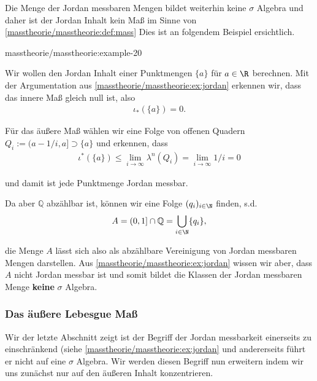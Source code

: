 \documentclass[letterpaper,10pt,english]{jupyterBook}
\begin{document}
\par
Die Menge der Jordan messbaren Mengen bildet weiterhin keine \(\sigma\) Algebra und daher ist der Jordan Inhalt kein Maß im Sinne von \cref{masstheorie/masstheorie:def:mass}  Dies ist an folgendem Beispiel ersichtlich.
\begin{example}{}{masstheorie/masstheorie:example-20}



\par
Wir wollen den Jordan Inhalt einer Punktmengen \(\{a\}\) für \(a\in\R\) berechnen. Mit der Argumentation aus \cref{masstheorie/masstheorie:ex:jordan} erkennen wir, dass das innere Maß gleich null ist, also
\begin{align*}
\iota_\ast(\{a\}) = 0.
\end{align*}
\par
Für das äußere Maß wählen wir eine Folge von offenen Quadern \(Q_i:= (a-1/i, a] \supset \{a\}\) und erkennen, dass
\begin{align*}
\iota^\ast(\{a\})\leq \lim_{i\to\infty} \lambda^n(Q_i) = \lim_{i\to\infty} 1/i = 0
\end{align*}
\par
und damit ist jede Punktmenge Jordan messbar.

\par
Da aber \(\mathbb{Q}\) abzählbar ist, können wir eine Folge \((q_i)_{i\in\N}\) finden, s.d.
\begin{align*}
A = (0,1]\cap \mathbb{Q} = \bigcup_{i\in\N} \{q_i\},
\end{align*}
\par
die Menge \(A\) lässt sich also als abzählbare Vereinigung von Jordan messbaren Mengen darstellen. Aus \cref{masstheorie/masstheorie:ex:jordan} wissen wir aber, dass \(A\) nicht Jordan messbar ist und somit bildet die Klassen der Jordan messbaren Menge \textbf{keine} \(\sigma\) Algebra.
\end{example}


\subsubsection{Das äußere Lebesgue Maß}
\label{\detokenize{masstheorie/masstheorie:das-auszere-lebesgue-masz}}
\par
Wir der letzte Abschnitt zeigt ist der Begriff der Jordan messbarkeit einerseits zu einschränkend (siehe \cref{masstheorie/masstheorie:ex:jordan}  und andererseits führt er nicht auf eine \(\sigma\) Algebra. Wir werden diesen Begriff nun erweitern indem wir uns zunächst nur auf den äußeren Inhalt konzentrieren.
\end{document}
